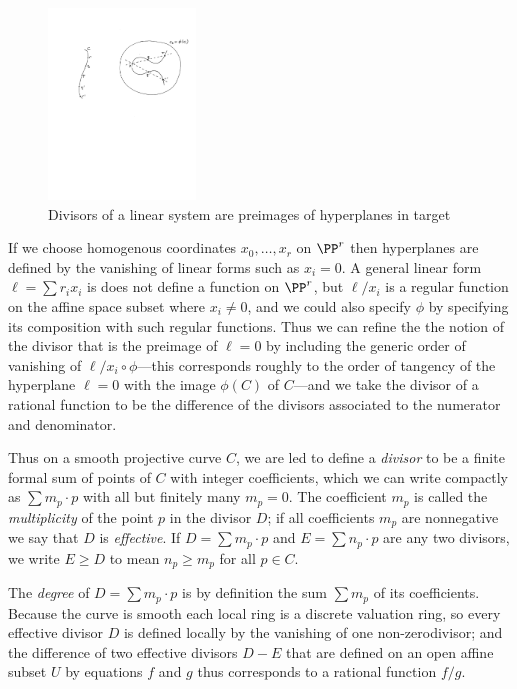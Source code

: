 \begin{figure}
 \caption{Divisors of a linear system are preimages of hyperplanes in target}
\centerline {\includegraphics[height=2in]{"Fig1.1.pdf"}}
\end{figure}

If we choose homogenous coordinates $x_0,\dots, x_r$ on $\PP^r$ then hyperplanes
are defined by the vanishing of linear forms such as $x_i=0$. A general linear form
$\ell = \sum r_ix_i$ is does not define a function on $\PP^r$, but $\ell/x_i$ is a regular function on the affine space subset where $x_i\neq 0$, and we could also
 specify $\phi$ by specifying its composition with such regular functions. Thus we can refine the the notion of the divisor that is the preimage of $\ell=0$ by including the generic order of vanishing of $\ell/x_i \circ \phi$---this corresponds roughly to the order of tangency
 of the hyperplane $\ell=0$ with the image $\phi(C)$ of $C$---and we take the divisor of a rational
 function to be the difference of the divisors associated to the numerator and denominator.

Thus on a smooth projective curve $C$, we are led to define a \emph{divisor} to be a finite formal sum of points of $C$ with integer coefficients, which we can write compactly as $\sum m_p\cdot p$ with all but finitely many $m_p=0$.  The coefficient $m_p$ is called the \emph{multiplicity} of the point $p$ in the divisor $D$; if all coefficients $m_p$ are nonnegative we say that $D$ is \emph{effective}. If $D = \sum m_p\cdot p$ and $E = \sum n_p\cdot p$ are any two divisors, we write $E \geq D$ to mean $n_p \geq m_p$ for all $p \in C$.

The \emph{degree} of  $D = \sum m_p\cdot p$ is by definition the sum $\sum m_p$ of its coefficients. Because the curve is smooth each local ring is a discrete valuation ring, so every effective divisor $D$ is defined locally by the vanishing of one non-zerodivisor; and the difference of two effective divisors $D - E$ that are defined on an open
affine subset $U$ by equations $f$ and $g$ thus corresponds to a rational function
$f/g$.


